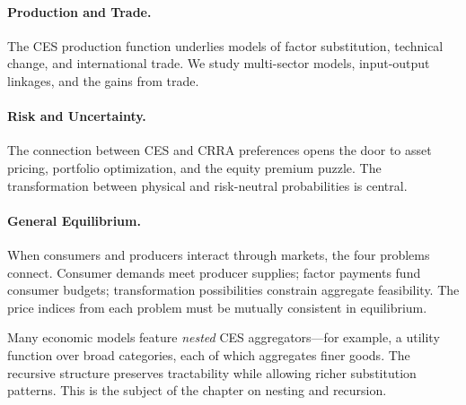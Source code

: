 \paragraph{Production and Trade.}
The CES production function underlies models of factor substitution, technical change, and international trade. We study multi-sector models, input-output linkages, and the gains from trade.

\paragraph{Risk and Uncertainty.}
The connection between CES and CRRA preferences opens the door to asset pricing, portfolio optimization, and the equity premium puzzle. The transformation between physical and risk-neutral probabilities is central.

\paragraph{General Equilibrium.}
When consumers and producers interact through markets, the four problems connect. Consumer demands meet producer supplies; factor payments fund consumer budgets; transformation possibilities constrain aggregate feasibility. The price indices from each problem must be mutually consistent in equilibrium.

\begin{calloutimportant}
Many economic models feature \emph{nested} CES aggregators---for example, a utility function over broad categories, each of which aggregates finer goods. The recursive structure preserves tractability while allowing richer substitution patterns. This is the subject of the chapter on nesting and recursion.
\end{calloutimportant}

